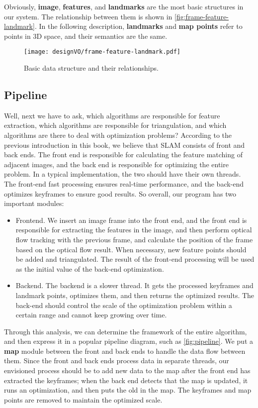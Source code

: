 Obviously, \textbf{image}, \textbf{features}, and \textbf{landmarks} are the most basic structures in our system. The relationship between them is shown in \autoref{fig:frame-feature-landmark}. In the following description, \textbf{landmarks} and \textbf{map points} refer to points in 3D space, and their semantics are the same.

\begin{figure}[!htp]
	\centering
	\texttt{[image: designVO/frame-feature-landmark.pdf]}
	\caption{Basic data structure and their relationships.}
	\label{fig:frame-feature-landmark}
\end{figure}

\subsection{Pipeline}
Well, next we have to ask, which algorithms are responsible for feature extraction, which algorithms are responsible for triangulation, and which algorithms are there to deal with optimization problems? According to the previous introduction in this book, we believe that SLAM consists of front and back ends. The front end is responsible for calculating the feature matching of adjacent images, and the back end is responsible for optimizing the entire problem. In a typical implementation, the two should have their own threads. The front-end fast processing ensures real-time performance, and the back-end optimizes keyframes to ensure good results. So overall, our program has two important modules:

\begin{itemize}
	\item Frontend. We insert an image frame into the front end, and the front end is responsible for extracting the features in the image, and then perform optical flow tracking with the previous frame, and calculate the position of the frame based on the optical flow result. When necessary, new feature points should be added and triangulated. The result of the front-end processing will be used as the initial value of the back-end optimization.
	\item Backend. The backend is a slower thread. It gets the processed keyframes and landmark points, optimizes them, and then returns the optimized results. The back-end should control the scale of the optimization problem within a certain range and cannot keep growing over time.
\end{itemize}

Through this analysis, we can determine the framework of the entire algorithm, and then express it in a popular pipeline diagram, such as \autoref{fig:pipeline}. We put a \textbf{map} module between the front and back ends to handle the data flow between them. Since the front and back ends process data in separate threads, our envisioned process should be to add new data to the map after the front end has extracted the keyframes; when the back end detects that the map is updated, it runs an optimization, and then puts the old in the map. The keyframes and map points are removed to maintain the optimized scale.

